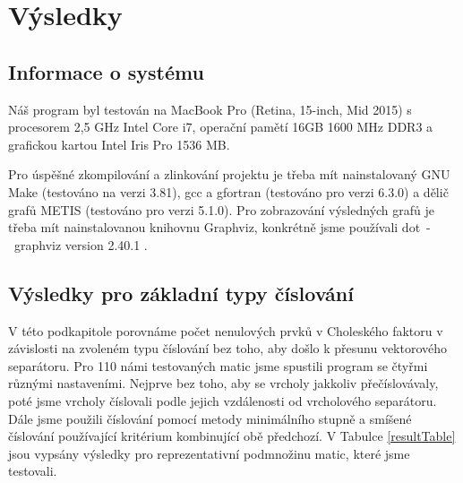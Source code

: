 \documentclass[11pt,american,czech,oneside]{book}
\theoremstyle{plain}
\theoremstyle{definition}
\begin{document}
\chapter{Výsledky}

\section{Informace o systému}
Náš program byl testován na MacBook Pro (Retina, 15-inch, Mid 2015) s procesorem 2,5 GHz Intel Core i7, operační pamětí 16GB 1600 MHz DDR3 a grafickou kartou Intel Iris Pro 1536 MB.

Pro úspěšné zkompilování a zlinkování projektu je třeba mít nainstalovaný GNU Make (testováno na verzi 3.81), gcc a gfortran (testováno pro verzi 6.3.0) a dělič grafů METIS (testováno pro verzi 5.1.0). Pro zobrazování výsledných grafů je třeba mít nainstalovanou knihovnu Graphviz, konkrétně jsme používali dot~-~graphviz version 2.40.1 \cite{graphviz}.

\section{Výsledky pro základní typy číslování}
\label{numberingResultsSection}
V této podkapitole porovnáme počet nenulových prvků v Choleského faktoru v závislosti na zvoleném typu číslování bez toho, aby došlo k přesunu vektorového separátoru. Pro 110 námi testovaných matic jsme spustili program se čtyřmi různými nastaveními. Nejprve bez toho, aby se vrcholy jakkoliv přečíslovávaly, poté jsme vrcholy číslovali podle jejich vzdálenosti od vrcholového separátoru. Dále jsme použili číslování pomocí metody minimálního stupně a smíšené číslování používající kritérium kombinující obě předchozí. V Tabulce \ref{resultTable} jsou vypsány výsledky pro reprezentativní podmnožinu matic, které jsme testovali. 
\end{document}
